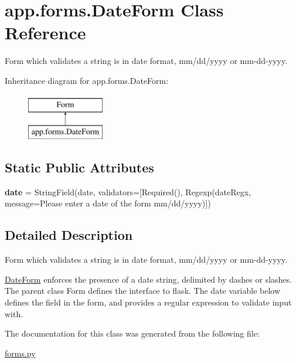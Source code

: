 \hypertarget{classapp_1_1forms_1_1DateForm}{}\section{app.\+forms.\+Date\+Form Class Reference}
\label{classapp_1_1forms_1_1DateForm}


Form which validates a string is in date format, mm/dd/yyyy or mm-\/dd-\/yyyy.  


Inheritance diagram for app.\+forms.\+Date\+Form\+:\begin{figure}[H]
\begin{center}
\leavevmode
\includegraphics[height=2.000000cm]{classapp_1_1forms_1_1DateForm}
\end{center}
\end{figure}
\subsection*{Static Public Attributes}
\begin{DoxyCompactItemize}
\item 
{\bfseries date} = String\+Field(\textquotesingle{}date\textquotesingle{}, validators=\mbox{[}Required(), Regexp(date\+Regx, message=\textquotesingle{}Please enter a date of the form mm/dd/yyyy\textquotesingle{})\mbox{]})\hypertarget{classapp_1_1forms_1_1DateForm_a346cfeee72d079f1a80d7061c39559d7}{}\label{classapp_1_1forms_1_1DateForm_a346cfeee72d079f1a80d7061c39559d7}

\end{DoxyCompactItemize}


\subsection{Detailed Description}
Form which validates a string is in date format, mm/dd/yyyy or mm-\/dd-\/yyyy. 

\hyperlink{classapp_1_1forms_1_1DateForm}{Date\+Form} enforces the presence of a date string, delimited by dashes or slashes. The parent class Form defines the interface to flask. The date variable below defines the field in the form, and provides a regular expression to validate input with. 

The documentation for this class was generated from the following file\+:\begin{DoxyCompactItemize}
\item 
\hyperlink{forms_8py}{forms.\+py}\end{DoxyCompactItemize}
